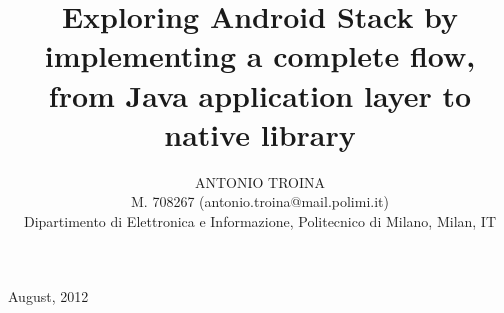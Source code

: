 \documentclass[acmplain,acmnow]{acmtrans2m}
\title{Exploring Android Stack by implementing a complete flow, from Java application layer to native library}
\author{ANTONIO TROINA\\
		{\small M. 708267 (antonio.troina@mail.polimi.it)}\\
		{\footnotesize Dipartimento di Elettronica e Informazione, Politecnico di Milano, Milan, IT}}
\begin{document}
\maketitle

\newpage
{}
\tableofcontents









\nocite{embandroid}
\nocite{andinternals}
\nocite{opersys}
\nocite{learningandroid}
\nocite{jni}

\begin{received}
August, 2012
\end{received}
\end{document}

